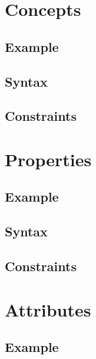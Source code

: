 \documentclass[a4paper,oneside,12pt, extrafontsizes]{memoir}
\begin{document}
  \chapter{Concepts}
  \label{ch:concepts}
  

    \section{Example}
    

    \section{Syntax}
    

    \section{Constraints}
    

  \chapter{Properties}
  \label{ch:properties}
  

    \section{Example}
    

    \section{Syntax}
    

    \section{Constraints}
    

  \chapter{Attributes}
  \label{ch:attributes}
  

    \section{Example}
    
\end{document}
